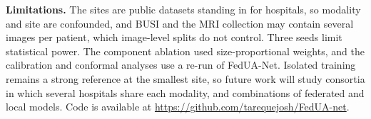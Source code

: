 \documentclass[]{spie}
\begin{document}
\textbf{Limitations.} The sites are public datasets standing in for hospitals, so modality and site are confounded, and BUSI and the MRI collection may contain several images per patient, which image-level splits do not control. Three seeds limit statistical power. The component ablation used size-proportional weights, and the calibration and conformal analyses use a re-run of FedUA-Net. Isolated training remains a strong reference at the smallest site, so future work will study consortia in which several hospitals share each modality, and combinations of federated and local models. Code is available at \url{https://github.com/tarequejosh/FedUA-net}.



\end{document}
